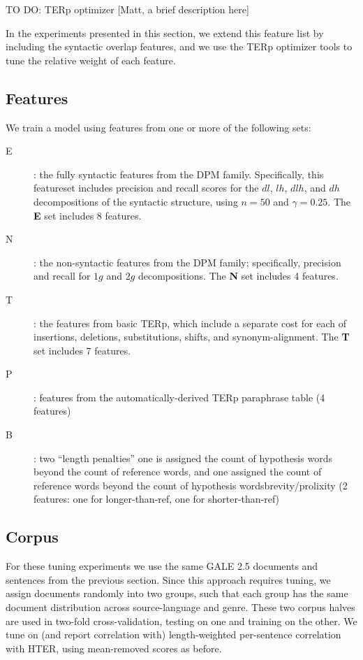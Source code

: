 \documentclass{kluwer}    %
\begin{document}
\begin{article}
TO DO: TERp optimizer [Matt, a brief description here]

In the experiments presented in this section, we extend this feature
list by including the syntactic overlap features, and we use the TERp
optimizer tools to tune the relative weight of each feature.

\subsection{Features}

We train a model using features from one or more of the following
sets:
\begin{description}
\item[E]: the fully syntactic features from the DPM family.
  Specifically, this featureset includes precision and recall scores
  for the $dl$, $lh$, $dlh$, and $dh$ decompositions of the syntactic
  structure, using $n=50$ and $\gamma=0.25$.  The \textbf{E} set
  includes 8 features.
\item[N]: the non-syntactic features from the DPM family;
  specifically, precision and recall for $1g$ and $2g$
  decompositions.  The \textbf{N} set includes 4 features.
\item[T]: the features from basic TERp, which include a separate cost
  for each of insertions, deletions, substitutions, shifts, and
  synonym-alignment. The \textbf{T} set includes 7 features.
\item[P]: features from the automatically-derived TERp paraphrase table
  (4 features)  %
\item[B]: two ``length penalties'' one is assigned the count of
  hypothesis words beyond the count of reference words, and one
  assigned the count of reference words beyond the count of hypothesis
  wordsbrevity/prolixity (2 features: one for longer-than-ref, one for
  shorter-than-ref)
\end{description}

\subsection{Corpus}

For these tuning experiments we use the same GALE 2.5 documents and
sentences from the previous section.  Since this approach requires
tuning, we assign documents randomly into two groups, such that each
group has the same document distribution across source-language and
genre.
%
These two corpus halves are used in two-fold cross-validation, testing
on one and training on the other.  We tune on (and report correlation with)
length-weighted per-sentence correlation with HTER, using mean-removed
scores as before.


\end{article}
\end{document}

